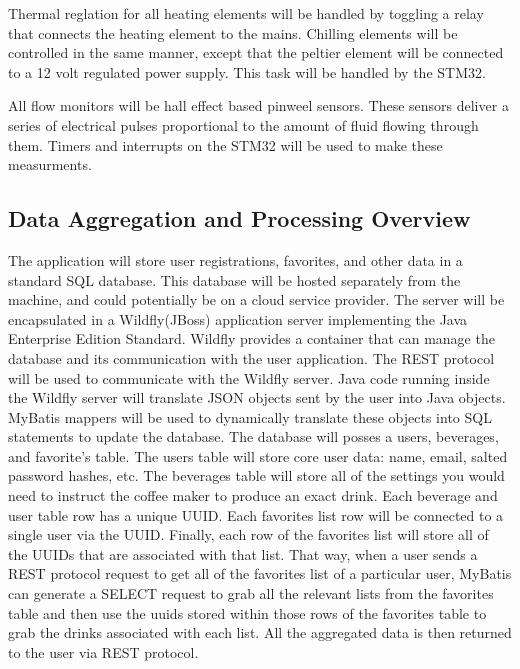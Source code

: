 \documentclass[conference]{IEEEtran}
\begin{document}
Thermal reglation for all heating elements will be handled by toggling a relay
that connects the heating element to the mains. Chilling elements will be
controlled in the same manner, except that the peltier element will be connected
to a 12 volt regulated power supply. This task will be handled by the STM32.
	
All flow monitors will be hall effect based pinweel sensors. These sensors
deliver a series of electrical pulses proportional to the amount of fluid
flowing through them. Timers and interrupts on the STM32 will be used to make
these measurments. 

\subsection{Data Aggregation and Processing Overview}
The application will store user registrations, favorites, and other data in a
standard SQL database. This database will be hosted separately from the
machine, and could potentially be on a cloud service provider. The server will
be encapsulated in a Wildfly(JBoss) application server implementing the Java
Enterprise Edition Standard. Wildfly provides a container that can manage the
database and its communication with the user application. The REST protocol
will be used to communicate with the Wildfly server. Java code running inside
the Wildfly server will translate JSON objects sent by the user into Java
objects. MyBatis mappers will be used to dynamically translate these objects
into SQL statements to update the database. The database will posses a users,
beverages, and favorite's table. The users table will store core user data:
name, email, salted password hashes, etc. The beverages table will store all of
the settings you would need to instruct the coffee maker to produce an exact
drink. Each beverage and user table row has a unique UUID. Each favorites list
row will be connected to a single user via the UUID. Finally, each row of the
favorites list will store all of the UUIDs that are associated with that list.
That way, when a user sends a REST protocol request to get all of the favorites
list of a particular user, MyBatis can generate a SELECT request to grab all
the relevant lists from the favorites table and then use the uuids stored
within those rows of the favorites table to grab the drinks associated with
each list. All the aggregated data is then returned to the user via REST protocol.
\end{document}
